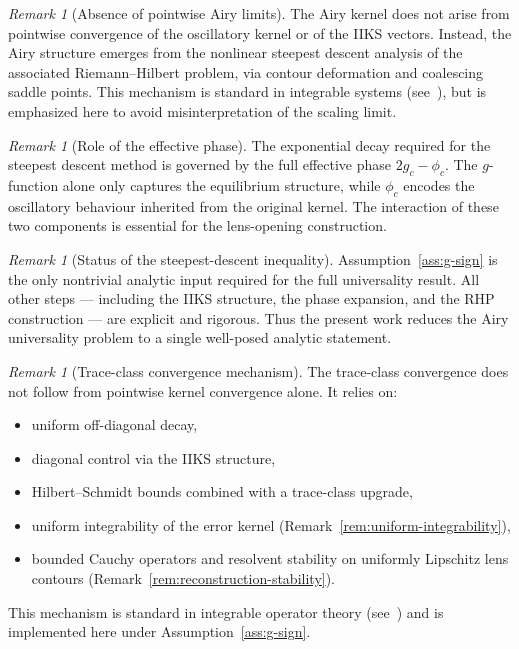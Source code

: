 \documentclass[12pt,a4paper]{amsart}
\theoremstyle{definition}
\theoremstyle{remark}
\newtheorem{remark}[theorem]{Remark}
\begin{document}
\begin{remark}[Absence of pointwise Airy limits]
\label{rem:no-pointwise-2}
The Airy kernel does not arise from pointwise convergence of the
oscillatory kernel or of the IIKS vectors.
Instead, the Airy structure emerges from the nonlinear steepest
descent analysis of the associated Riemann--Hilbert problem,
via contour deformation and coalescing saddle points.
This mechanism is standard in integrable systems
(see~\cite{Deift1999}), but is emphasized here to avoid
misinterpretation of the scaling limit.
\end{remark}

\begin{remark}[Role of the effective phase]
\label{rem:phase-clarification}
The exponential decay required for the steepest descent method
is governed by the full effective phase $2g_c - \phi_c$.
The $g$-function alone only captures the equilibrium structure,
while $\phi_c$ encodes the oscillatory behaviour inherited from
the original kernel.
The interaction of these two components is essential for the
lens-opening construction.
\end{remark}

\begin{remark}[Status of the steepest-descent inequality]
\label{rem:assumption-status}
Assumption~\ref{ass:g-sign} is the only nontrivial analytic input
required for the full universality result.
All other steps --- including the IIKS structure, the phase
expansion, and the RHP construction --- are explicit and rigorous.
Thus the present work reduces the Airy universality problem
to a single well-posed analytic statement.
\end{remark}

\begin{remark}[Trace-class convergence mechanism]
\label{rem:trace-mechanism}
The trace-class convergence does not follow from pointwise kernel
convergence alone.
It relies on:
\begin{itemize}
\item uniform off-diagonal decay,
\item diagonal control via the IIKS structure,
\item Hilbert--Schmidt bounds combined with a trace-class upgrade,
\item uniform integrability of the error kernel
  (Remark~\ref{rem:uniform-integrability}),
\item bounded Cauchy operators and resolvent stability on uniformly
  Lipschitz lens contours
  (Remark~\ref{rem:reconstruction-stability}).
\end{itemize}
This mechanism is standard in integrable operator theory
(see~\cite{ItsIzergin1990,Kato1966}) and is implemented here
under Assumption~\ref{ass:g-sign}.
\end{remark}
\end{document}
